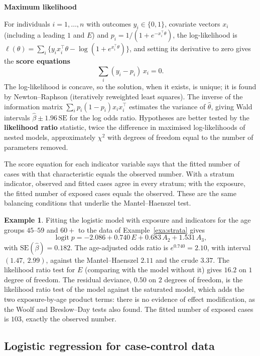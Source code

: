 \documentclass[11pt,a4paper]{article}
\numberwithin{equation}{section}
\theoremstyle{definition}
\newtheorem{exa}[thm]{Example}
\newcommand{\subhead}[1]{%
  \par\medskip\noindent\textbf{#1}\par\nobreak\smallskip}
\begin{document}
\subhead{Maximum likelihood}

For individuals $i = 1, \dots, n$ with outcomes $y_i \in \{0, 1\}$, covariate vectors $x_i$ (including a leading $1$ and $E$) and $p_i = 1/(1 + e^{-x_i^\top\theta})$, the
log-likelihood is $\ell(\theta) = \sum_i \{y_i x_i^\top\theta - \log(1 + e^{x_i^\top\theta})\}$, and setting its derivative to zero gives the \textbf{score equations}
\[
\sum_i (y_i - p_i)\,x_i = 0 .
\]
The log-likelihood is concave, so the solution, when it exists, is unique; it is found by Newton--Raphson (iteratively reweighted least
squares). The inverse of the information matrix $\sum_i p_i(1 - p_i)x_i x_i^\top$ estimates the variance of $\hat\theta$, giving Wald intervals $\hat\beta \pm 1.96\,\text{SE}$
for the log odds ratio. Hypotheses are better tested by the \textbf{likelihood ratio} statistic, twice the difference in maximised
log-likelihoods of nested models, approximately $\chi^2$ with degrees of freedom equal to the number of parameters removed.

The score equation for each indicator variable says that the fitted number of cases with that characteristic equals the observed
number. With a stratum indicator, observed and fitted cases agree in every stratum; with the exposure, the fitted number of exposed
cases equals the observed. These are the same balancing conditions that underlie the Mantel--Haenszel test.

\begin{exa}
\label{exa:logistic}
Fitting the logistic model with exposure and indicators for the age groups $45$--$59$ and $60+$ to the data of Example~\ref{exa:strata} gives
\[
\operatorname{logit} p = -2.086 + 0.740\,E + 0.683\,A_2 + 1.531\,A_3 ,
\]
with $\text{SE}(\hat\beta) = 0.182$. The age-adjusted odds ratio is $e^{0.740} = 2.10$, with interval $(1.47,\ 2.99)$, against the Mantel--Haenszel $2.11$ and the crude
$3.37$. The likelihood ratio test for $E$ (comparing with the model without it) gives $16.2$ on $1$ degree of freedom. The residual deviance,
$0.50$ on $2$ degrees of freedom, is the likelihood ratio test of the model against the saturated model, which adds the two exposure-by-age
product terms: there is no evidence of effect modification, as the Woolf and Breslow--Day tests also found. The fitted number of exposed
cases is $103$, exactly the observed number.
\end{exa}

\subsection{Logistic regression for case-control data}
\end{document}
